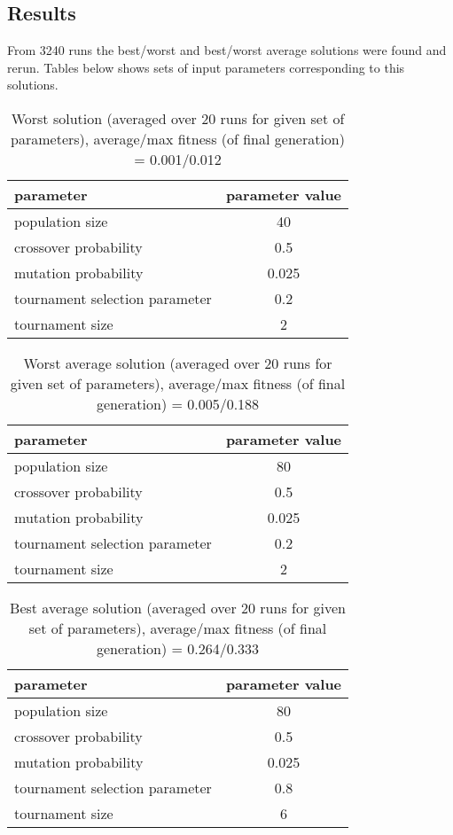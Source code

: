 \documentclass[main.tex]{subfiles}
\begin{document}
\newpage
\subsection{Results}

From 3240 runs the best/worst and best/worst average solutions were found and rerun. Tables below shows sets of input parameters corresponding to this solutions.

\begin{table}[H]
\centering
\caption{Worst solution (averaged over 20 runs for given set of parameters), \n average/max fitness (of final generation) = 0.001/0.012}
\begin{tabular}{l | c  }
parameter & parameter value \\
\hline \hline
population size               &	40 \\
crossover probability         &	0.5\\
mutation probability          &	0.025\\
tournament selection parameter&	0.2\\
tournament size               &	2\\
\end{tabular}
\end{table}
\begin{table}[H]
\centering
\caption{Worst average solution (averaged over 20 runs for given set of parameters), \n average/max fitness (of final generation) = 0.005/0.188}
\begin{tabular}{l | c  }
parameter & parameter value \\
\hline \hline
population size               &	80 \\
crossover probability         &	0.5\\
mutation probability          &	0.025\\
tournament selection parameter&	0.2\\
tournament size               &	2\\
\end{tabular}
\end{table}
\begin{table}[H]
\centering
\caption{Best average solution (averaged over 20 runs for given set of parameters), \n average/max fitness (of final generation) = 0.264/0.333}
\begin{tabular}{l | c  }
parameter & parameter value \\
\hline \hline
population size               &	80 \\
crossover probability         &	0.5\\
mutation probability          &	0.025\\
tournament selection parameter&	0.8\\
tournament size               &	6\\
\end{tabular}
\end{table}
\end{document}
